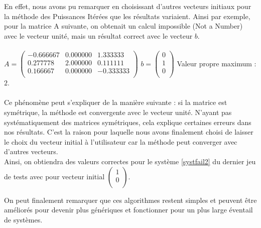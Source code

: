 \documentclass{report}
\begin{document}
    En effet, nous avons pu remarquer en choisissant d'autres vecteurs initiaux pour la méthode des Puissances Itérées que les résultats variaient. Ainsi par exemple, pour la matrice A suivante, on obtenait un calcul impossible (Not a Number) avec le vecteur unité, mais un résultat correct avec le vecteur $b$.\\ \\
    \indent
    $A = \begin{pmatrix}
      -0.666667 & 0.000000 & 1.333333 \\ 
      0.277778 & 2.000000 & 0.111111 \\ 
      0.166667 & 0.000000 & -0.333333 \\
    \end{pmatrix}$
    \indent
    $b=\begin{pmatrix}
      0 \\ 
      1 \\ 
      0 \\
    \end{pmatrix}$
    \indent
    Valeur propre maximum : $2$.\\
    \\
    Ce phénomène peut s'expliquer de la manière suivante : si la matrice est symétrique, la méthode est convergente avec le vecteur unité. N'ayant pas systématiquement des matrices symétriques, cela explique certaines erreurs dans nos résultats. C'est la raison pour laquelle nous avons finalement choisi de laisser le choix du vecteur initial à l'utilisateur car la méthode peut converger avec d'autres vecteurs.
    \\
    
    Ainsi, on obtiendra des valeurs correctes pour le système \eqref{systfail2} du dernier jeu de tests avec pour vecteur initial  $\begin{pmatrix}
      1 \\ 
      0 \\
    \end{pmatrix}$.
    
    On peut finalement remarquer que ces algorithmes restent simples et peuvent être améliorés pour devenir plus génériques et fonctionner pour un plus large éventail de systèmes.
\end{document}
